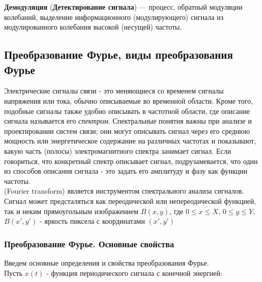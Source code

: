{\bf Демодуляция} ({\bf Детектирование сигнала}) — процесс, обратный модуляции колебаний, выделение информационного (модулирующего) сигнала из модулированного колебания высокой (несущей) частоты.


\newpage

\subsection{Преобразование Фурье, виды преобразования Фурье}
Электрические сигналы связи - это меняющиеся со временем сигналы напряжения или тока, обычно описываемые во временной области. Кроме того, подобные сигналы также удобно описывать в частотной области, где описание сигнала называется его {\it спектром}. Спектральные понятия важны при анализе и проектировании систем связи; они могут описывать сигнал через его среднюю мощность или энергетическое содержание на различных частотах и показывают, какую часть (полосы) электромагнитного спектра занимает сигнал. Если говориться, что конкретный спектр описывает сигнал, подрузамевается, что один из способов описания сигнала - это задать его амплитуду и фазу как функции частоты.\\ (Fourier transform) является инструментом спектрального анализа сигналов. \\\indent Сигнал может предсталяться как переодической или непереодической функцией, так и неким прямоугольным изображением $B(x,y)$, где $ 0 \leq x\leq X$, $0 \leq y\leq Y$, $B(x',y')$ - яркость пиксела с координатами $(x',y')$ %

\subsubsection{Преобразование Фурье. Основные свойства} %
Введем основные определения и свойства преобразования Фурье.\\
Пусть $x(t)$ - функция периодического сигнала с конечной энергией:

